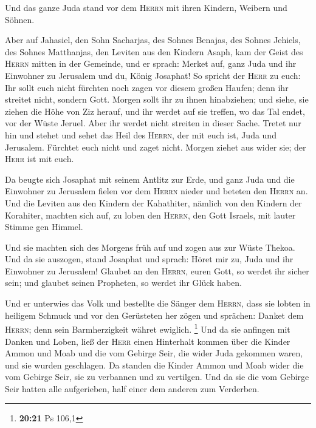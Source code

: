  Und das ganze Juda stand vor dem \textsc{Herrn} mit
ihren Kindern, Weibern und Söhnen.

 Aber auf Jahasiel, den Sohn Sacharjas, des Sohnes
Benajas, des Sohnes Jehiels, des Sohnes Matthanjas, den Leviten aus den
Kindern Asaph, kam der Geist des \textsc{Herrn} mitten in der Gemeinde,
 und er sprach: Merket auf, ganz Juda und ihr Einwohner
zu Jerusalem und du, König Josaphat! So spricht der \textsc{Herr} zu
euch: Ihr sollt euch nicht fürchten noch zagen vor diesem großen Haufen;
denn ihr streitet nicht, sondern Gott.  Morgen sollt ihr
zu ihnen hinabziehen; und siehe, sie ziehen die Höhe von Ziz herauf, und
ihr werdet auf sie treffen, wo das Tal endet, vor der Wüste Jeruel.
 Aber ihr werdet nicht streiten in dieser Sache. Tretet
nur hin und stehet und sehet das Heil des \textsc{Herrn}, der mit euch
ist, Juda und Jerusalem. Fürchtet euch nicht und zaget nicht. Morgen
ziehet aus wider sie; der \textsc{Herr} ist mit euch.

 Da beugte sich Josaphat mit seinem Antlitz zur Erde, und
ganz Juda und die Einwohner zu Jerusalem fielen vor dem \textsc{Herrn}
nieder und beteten den \textsc{Herrn} an.  Und die
Leviten aus den Kindern der Kahathiter, nämlich von den Kindern der
Korahiter, machten sich auf, zu loben den \textsc{Herrn}, den Gott
Israels, mit lauter Stimme gen Himmel.

 Und sie machten sich des Morgens früh auf und zogen aus
zur Wüste Thekoa. Und da sie auszogen, stand Josaphat und sprach: Höret
mir zu, Juda und ihr Einwohner zu Jerusalem! Glaubet an den
\textsc{Herrn}, euren Gott, so werdet ihr sicher sein; und glaubet
seinen Propheten, so werdet ihr Glück haben.

 Und er unterwies das Volk und bestellte die Sänger dem
\textsc{Herrn}, dass sie lobten in heiligem Schmuck und vor den
Gerüsteten her zögen und sprächen: Danket dem \textsc{Herrn}; denn sein
Barmherzigkeit währet ewiglich. \footnote{\textbf{20:21} Ps 106,1}
 Und da sie anfingen mit Danken und Loben, ließ der
\textsc{Herr} einen Hinterhalt kommen über die Kinder Ammon und Moab und
die vom Gebirge Seir, die wider Juda gekommen waren, und sie wurden
geschlagen.  Da standen die Kinder Ammon und Moab wider
die vom Gebirge Seir, sie zu verbannen und zu vertilgen. Und da sie die
vom Gebirge Seir hatten alle aufgerieben, half einer dem anderen zum
Verderben.

